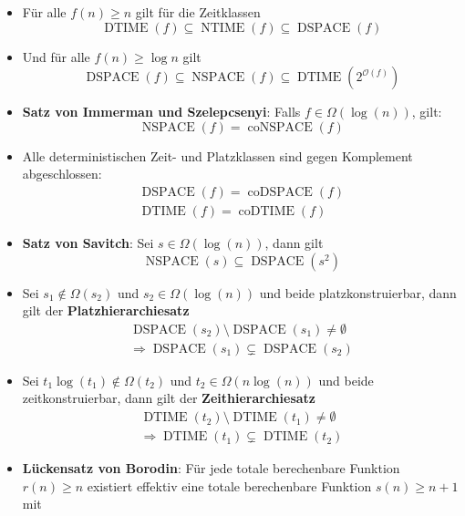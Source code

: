 \documentclass[landscape, 8pt, a4paper]{extarticle}
\begin{document}
\begin{multicols}{3}
\begin{itemize}
		\item Für alle $f(n)\geq n$ gilt für die Zeitklassen
		\begin{equation*}
			\operatorname{DTIME}(f)\subseteq\operatorname{NTIME}(f)\subseteq\operatorname{DSPACE}(f)
		\end{equation*}
		\item Und für alle $f(n)\geq \log n$ gilt
		\begin{equation*}
			\operatorname{DSPACE}(f)\subseteq\operatorname{NSPACE}(f)\subseteq\operatorname{DTIME}(2^{\mathcal O(f)})
		\end{equation*}
		\item \textbf{Satz von Immerman und Szelepcsenyi}: Falls $f\in \Omega(\log(n))$, gilt:
		\begin{equation*}
			\operatorname{NSPACE}(f)=\operatorname{coNSPACE}(f)
		\end{equation*}
		\item Alle deterministischen Zeit- und Platzklassen sind gegen Komplement abgeschlossen:
		\begin{gather*}
			\operatorname{DSPACE}(f)=\operatorname{coDSPACE}(f)\\
			\operatorname{DTIME}(f)=\operatorname{coDTIME}(f)
		\end{gather*}
		\item \textbf{Satz von Savitch}: Sei $s\in\Omega(\log(n))$, dann gilt
		\begin{equation*}
			\operatorname{NSPACE}(s)\subseteq\operatorname{DSPACE}(s^2)
		\end{equation*}
		\item Sei $s_1\not\in\Omega(s_2)$ und $s_2\in\Omega(\log(n))$ und beide platzkonstruierbar, dann gilt der \textbf{Platzhierarchiesatz}
		\begin{gather*}
			\operatorname{DSPACE}(s_2)\setminus\operatorname{DSPACE}(s_1)\not=\emptyset\\
			\Rightarrow \operatorname{DSPACE}(s_1)\subsetneq\operatorname{DSPACE}(s_2)
		\end{gather*}
		\item Sei $t_1\log(t_1)\not\in\Omega(t_2)$ und $t_2\in\Omega(n\log(n))$ und beide zeitkonstruierbar, dann gilt der \textbf{Zeithierarchiesatz}
		\begin{gather*}
			\operatorname{DTIME}(t_2)\setminus\operatorname{DTIME}(t_1)\not=\emptyset\\
			\Rightarrow \operatorname{DTIME}(t_1)\subsetneq \operatorname{DTIME}(t_2)
		\end{gather*}
		\item \textbf{Lückensatz von Borodin}: Für jede totale berechenbare Funktion $r(n)\geq n$ existiert effektiv eine totale berechenbare Funktion $s(n)\geq n+1$ mit

\end{itemize}
\end{multicols}
\end{document}
